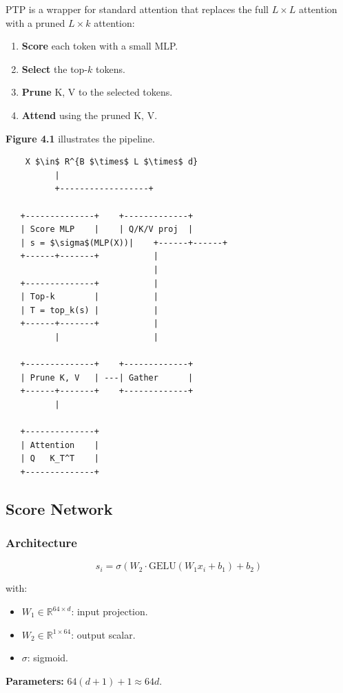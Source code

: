 PTP is a wrapper for standard attention that replaces the full $L \times L$ 
attention with a pruned $L \times k$ attention:

\begin{enumerate}
\item \textbf{Score} each token with a small MLP.
\item \textbf{Select} the top-$k$ tokens.
\item \textbf{Prune} K, V to the selected tokens.
\item \textbf{Attend} using the pruned K, V.

\end{enumerate}
\textbf{Figure 4.1} illustrates the pipeline.

\begin{lstlisting}
    X $\in$ R^{B $\times$ L $\times$ d}
          |
          +------------------+
                              
   +--------------+    +-------------+
   | Score MLP    |    | Q/K/V proj  |
   | s = $\sigma$(MLP(X))|    +------+------+
   +------+-------+           |
                              |
   +--------------+           |
   | Top-k        |           |
   | T = top_k(s) |           |
   +------+-------+           |
          |                   |
                               
   +--------------+    +-------------+
   | Prune K, V   | ---| Gather      |
   +------+-------+    +-------------+
          |
           
   +--------------+
   | Attention    |
   | Q   K_T^T    |
   +--------------+
\end{lstlisting}

\subsection{Score Network}

\subsubsection{Architecture}

\[
s_i = \sigma\!\left(W_2 \cdot \text{GELU}(W_1 x_i + b_1) + b_2\right)
\tag{4.1}
\]

with:
\begin{itemize}
\item $W_1 \in \mathbb{R}^{64 \times d}$: input projection.
\item $W_2 \in \mathbb{R}^{1 \times 64}$: output scalar.
\item $\sigma$: sigmoid.

\end{itemize}
\textbf{Parameters:} $64 (d + 1) + 1 \approx 64 d$.

